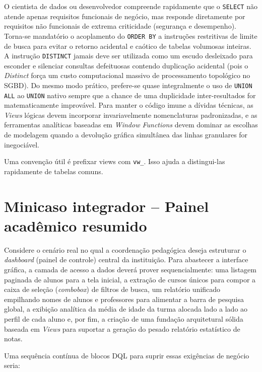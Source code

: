 O cientista de dados ou desenvolvedor compreende rapidamente que o \texttt{SELECT} não atende apenas requisitos funcionais de negócio, mas responde diretamente por requisitos não funcionais de extrema criticidade (segurança e desempenho). Torna-se mandatório o acoplamento do \texttt{ORDER BY} a instruções restritivas de limite de busca para evitar o retorno acidental e caótico de tabelas volumosas inteiras. A instrução \texttt{DISTINCT} jamais deve ser utilizada como um escudo desleixado para esconder e silenciar consultas defeituosas contendo duplicação acidental (pois o \textit{Distinct} força um custo computacional massivo de processamento topológico no SGBD). Do mesmo modo prático, prefere-se quase integralmente o uso de \texttt{UNION ALL} ao \texttt{UNION} nativo sempre que a chance de uma duplicidade inter-resultados for matematicamente improvável. Para manter o código imune a dívidas técnicas, as \textit{Views} lógicas devem incorporar invariavelmente nomenclaturas padronizadas, e as ferramentas analíticas baseadas em \textit{Window Functions} devem dominar as escolhas de modelagem quando a devolução gráfica simultânea das linhas granulares for inegociável.

\begin{quadro_dica}
Uma convenção útil é prefixar views com \texttt{vw\_}. Isso ajuda a distingui-las rapidamente de tabelas comuns.
\end{quadro_dica}

\section{Minicaso integrador -- Painel acadêmico resumido}

Considere o cenário real no qual a coordenação pedagógica deseja estruturar o \textit{dashboard} (painel de controle) central da instituição. Para abastecer a interface gráfica, a camada de acesso a dados deverá prover sequencialmente: uma listagem paginada de alunos para a tela inicial, a extração de cursos únicos para compor a caixa de seleção (\textit{combobox}) de filtros de busca, um relatório unificado empilhando nomes de alunos e professores para alimentar a barra de pesquisa global, a exibição analítica da média de idade da turma alocada lado a lado ao perfil de cada aluno e, por fim, a criação de uma fundação arquitetural sólida baseada em \textit{Views} para suportar a geração do pesado relatório estatístico de notas.

Uma sequência contínua de blocos DQL para suprir essas exigências de negócio seria:

